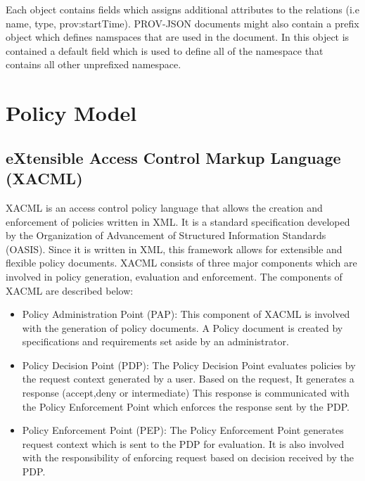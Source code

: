Each object contains fields which assigns additional attributes to the relations (i.e name, type, prov:startTime).  PROV-JSON documents might also contain a prefix object which defines namspaces that are used in the document. In this object is contained a default field which is used to define all of the namespace that contains all other unprefixed namespace.





\section{Policy Model}

\subsection{eXtensible Access Control Markup Language (XACML)}
 XACML is an access control policy language that allows the creation and enforcement of policies written in XML. It is a standard specification developed by the Organization of Advancement of Structured Information Standards (OASIS). Since it is written in XML, this framework allows for extensible and flexible policy documents. XACML consists of three major components which are involved in policy generation, evaluation and enforcement. The components of XACML are described below: 
 
 
 \begin{itemize}
 
 \item Policy Administration Point (PAP): This component of XACML
is involved with the generation of policy documents. A Policy document is created by specifications and requirements set aside by an administrator.

 \item Policy Decision Point (PDP): The Policy Decision Point evaluates policies by the request context generated by a user. Based on the request, It generates a response (accept,deny or intermediate) This response is communicated with the Policy Enforcement Point which enforces the response sent by the PDP.


\item Policy Enforcement Point (PEP):  The Policy Enforcement Point generates request context which is sent to the PDP for evaluation. It is also involved with the responsibility of enforcing request based on decision received by the PDP.

 \end{itemize}
 
